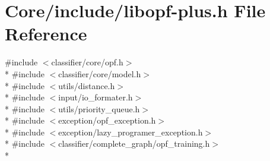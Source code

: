 \hypertarget{libopf-plus_8h}{\section{Core/include/libopf-\/plus.h File Reference}
\label{libopf-plus_8h}
}
{\ttfamily \#include $<$classifier/core/opf.\+h$>$}\\*
{\ttfamily \#include $<$classifier/core/model.\+h$>$}\\*
{\ttfamily \#include $<$utils/distance.\+h$>$}\\*
{\ttfamily \#include $<$input/io\+\_\+formater.\+h$>$}\\*
{\ttfamily \#include $<$utils/priority\+\_\+queue.\+h$>$}\\*
{\ttfamily \#include $<$exception/opf\+\_\+exception.\+h$>$}\\*
{\ttfamily \#include $<$exception/lazy\+\_\+programer\+\_\+exception.\+h$>$}\\*
{\ttfamily \#include $<$classifier/complete\+\_\+graph/opf\+\_\+training.\+h$>$}\\*
